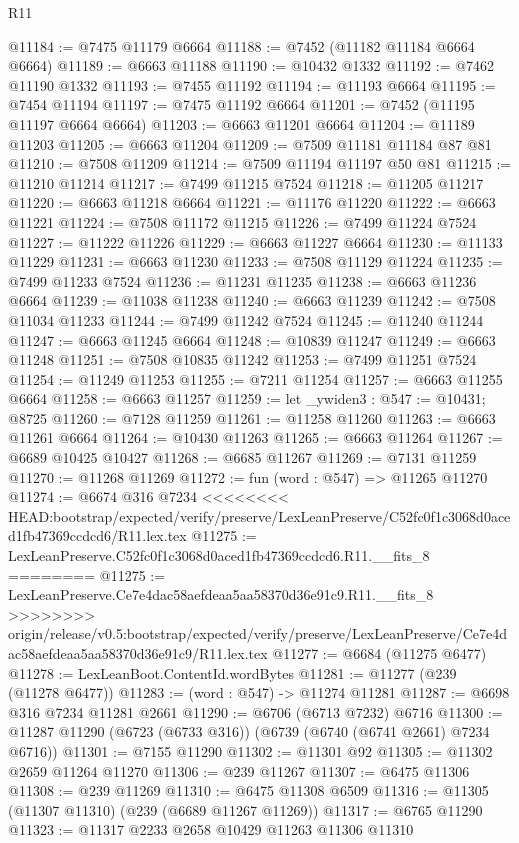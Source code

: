 \begin{lexlean}{R11}
\begin{coremodule}
{{{{{{{{{{{{{{{{{{{{{{{{{{{{{{{{{{{{{{{{{{{{{{{{{{{{{{{{{{{{{{{{{{{{{{{{{{{{{{{{{{@11184 := @7475 @11179 @6664
@11188 := @7452 (@11182 @11184 @6664 @6664)
@11189 := @6663 @11188
@11190 := @10432 @1332
@11192 := @7462 @11190 @1332
@11193 := @7455 @11192
@11194 := @11193 @6664
@11195 := @7454 @11194
@11197 := @7475 @11192 @6664
@11201 := @7452 (@11195 @11197 @6664 @6664)
@11203 := @6663 @11201 @6664
@11204 := @11189 @11203
@11205 := @6663 @11204
@11209 := @7509 @11181 @11184 @87 @81
@11210 := @7508 @11209
@11214 := @7509 @11194 @11197 @50 @81
@11215 := @11210 @11214
@11217 := @7499 @11215 @7524
@11218 := @11205 @11217
@11220 := @6663 @11218 @6664
@11221 := @11176 @11220
@11222 := @6663 @11221
@11224 := @7508 @11172 @11215
@11226 := @7499 @11224 @7524
@11227 := @11222 @11226
@11229 := @6663 @11227 @6664
@11230 := @11133 @11229
@11231 := @6663 @11230
@11233 := @7508 @11129 @11224
@11235 := @7499 @11233 @7524
@11236 := @11231 @11235
@11238 := @6663 @11236 @6664
@11239 := @11038 @11238
@11240 := @6663 @11239
@11242 := @7508 @11034 @11233
@11244 := @7499 @11242 @7524
@11245 := @11240 @11244
@11247 := @6663 @11245 @6664
@11248 := @10839 @11247
@11249 := @6663 @11248
@11251 := @7508 @10835 @11242
@11253 := @7499 @11251 @7524
@11254 := @11249 @11253
@11255 := @7211 @11254
@11257 := @6663 @11255 @6664
@11258 := @6663 @11257
@11259 := let _ywiden3 : @547 := @10431; @8725
@11260 := @7128 @11259
@11261 := @11258 @11260
@11263 := @6663 @11261 @6664
@11264 := @10430 @11263
@11265 := @6663 @11264
@11267 := @6689 @10425 @10427
@11268 := @6685 @11267
@11269 := @7131 @11259
@11270 := @11268 @11269
@11272 := fun (word : @547) => @11265 @11270
@11274 := @6674 @316 @7234
<<<<<<<< HEAD:bootstrap/expected/verify/preserve/LexLeanPreserve/C52fc0f1c3068d0aced1fb47369ccdcd6/R11.lex.tex
@11275 := LexLeanPreserve.C52fc0f1c3068d0aced1fb47369ccdcd6.R11.__fits_8
========
@11275 := LexLeanPreserve.Ce7e4dac58aefdeaa5aa58370d36e91c9.R11.__fits_8
>>>>>>>> origin/release/v0.5:bootstrap/expected/verify/preserve/LexLeanPreserve/Ce7e4dac58aefdeaa5aa58370d36e91c9/R11.lex.tex
@11277 := @6684 (@11275 @6477)
@11278 := LexLeanBoot.ContentId.wordBytes
@11281 := @11277 (@239 (@11278 @6477))
@11283 := (word : @547) -> @11274 @11281
@11287 := @6698 @316 @7234 @11281 @2661
@11290 := @6706 (@6713 @7232) @6716
@11300 := @11287 @11290 (@6723 (@6733 @316)) (@6739 (@6740 (@6741 @2661) @7234 @6716))
@11301 := @7155 @11290
@11302 := @11301 @92
@11305 := @11302 @2659 @11264 @11270
@11306 := @239 @11267
@11307 := @6475 @11306
@11308 := @239 @11269
@11310 := @6475 @11308 @6509
@11316 := @11305 (@11307 @11310) (@239 (@6689 @11267 @11269))
@11317 := @6765 @11290
@11323 := @11317 @2233 @2658 @10429 @11263 @11306 @11310
}}}}}}}}}}}}}}}}}}}}}}}}}}}}}}}}}}}}}}}}}}}}}}}}}}}}}}}}}}}}}}}}}}}}}}}}}}}}}}}}}}
\end{coremodule}
\end{lexlean}
